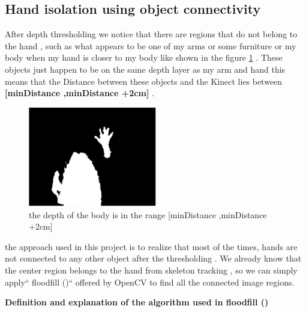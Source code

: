 \subsection{Hand isolation using object connectivity }

After depth thresholding we notice that there are regions that do not belong to the hand , such as what appears to be one of my  arms or some furniture or my body when my hand is closer to my body like shown in the figure  \ref{fig:cam10} . These objects just happen to be on the same depth layer as my arm and hand this means that the Distance between these objects and the Kinect lies  between \textbf{[minDistance ,minDistance +2cm]} .
\newline

\begin{figure}[H]
\centering
\includegraphics[width=0.5\textwidth]{img/depththresholding.png}
\caption{the depth of the body is in  the range [minDistance ,minDistance +2cm]}
\label{fig:cam10}
\end{figure}


the approach used in this project  is to realize that most of the times, hands are not connected to any other object after the thresholding . We already know that the center region belongs to the hand from skeleton tracking , so we can simply apply`` floodfill ()`` offered by OpenCV to find all the connected image regions.\newline

\textbf{ Definition and explanation of the algorithm used in floodfill () }

